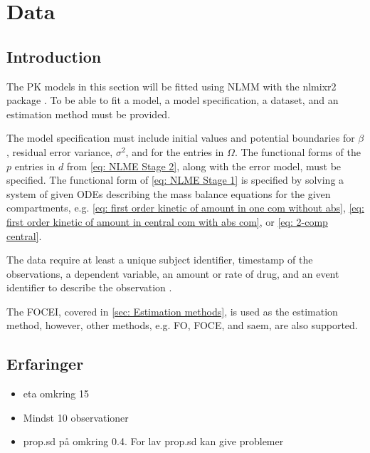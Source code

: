 \chapter{Data}
\section{Introduction}
The PK models in this section will be fitted using NLMM with the nlmixr2 package \citep{nlmixr, nlmixrarticle}. To be able to fit a model, a model specification, a dataset, and an estimation method must be provided.

The model specification must include initial values and potential boundaries for $\beta$, residual error variance, $\sigma^2$, and for the entries in $\Omega$. The functional forms of the $p$ entries in $d$ from \eqref{eq: NLME Stage 2}, along with the error model, must be specified.
The functional form of \ref{eq: NLME Stage 1} is specified by solving a system of given ODEs describing the mass balance equations for the given compartments, e.g. \eqref{eq: first order kinetic of amount in one com without abs}, \eqref{eq: first order kinetic of amount in central com with abs com}, or \eqref{eq: 2-comp central}.

The data require at least a unique subject identifier, timestamp of the observations, a dependent variable, an amount or rate of drug, and an event identifier to describe the observation \citep{nlmixrarticle}. 

The FOCEI, covered in \ref{sec: Estimation methods}, is used as the estimation method, however, other methods, e.g. FO, FOCE, and saem, are also supported. 







\section{Erfaringer}
\begin{itemize}
    \item eta omkring 15
    \item Mindst 10 observationer
    \item prop.sd på omkring 0.4. For lav prop.sd kan give problemer
\end{itemize}


